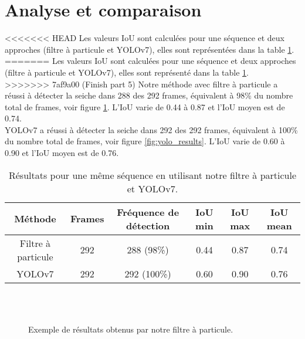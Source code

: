 \clearpage
\section{Analyse et comparaison}
<<<<<<< HEAD
Les valeurs IoU sont calculées pour une séquence et deux approches (filtre à particule et YOLOv7), elles sont représentées dans la table \ref{tab:results}.\\
=======
Les valeurs IoU sont calculées pour une séquence et deux approches (filtre à particule et YOLOv7), elles sont représenté dans la table \ref{tab:results}.\\
>>>>>>> 7af9a00 (Finish part 5)
Notre méthode avec filtre à particule a réussi à détecter la seiche dans 288 des 292 frames, équivalent à 98\% du nombre total de frames, voir figure \ref{fig:pf_results}. L'IoU varie de 0.44 à 0.87 et l'IoU moyen est de 0.74.\\
YOLOv7 a réussi à détecter la seiche dans 292 des 292 frames, équivalent à 100\% du nombre total de frames, voir figure \ref{fig:yolo_results}. L'IoU varie de 0.60 à 0.90 et l'IoU moyen est de 0.76.

\begin{table}[!htbp]
\begin{tabular}{|c|c|c|c|c|c|}
\hline
Méthode & Frames & Fréquence de détection & IoU min & IoU max & IoU mean\\
\hline
Filtre à particule & 292 & 288 (98\%) & 0.44 & 0.87 & 0.74\\
\hline
YOLOv7 & 292 & 292 (100\%) & 0.60 & 0.90 & 0.76\\
\hline
\end{tabular}
\caption{Résultats pour une même séquence en utilisant notre filtre à particule et YOLOv7.}
\label{tab:results}
\end{table}
\FloatBarrier

\begin{figure}[!htbp]
\center
	\hspace{0.1cm}
	\\
	\hspace{0.1cm}
	\\
	\hspace{0.1cm}
\caption{Exemple de résultats obtenus par notre filtre à particule.}
\label{fig:pf_results}
\end{figure}
\FloatBarrier

